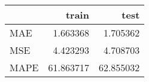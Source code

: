 \begin{tabular}{lrr}
\toprule
{} &      train &       test \\
\midrule
MAE  &   1.663368 &   1.705362 \\
MSE  &   4.423293 &   4.708703 \\
MAPE &  61.863717 &  62.855032 \\
\bottomrule
\end{tabular}
